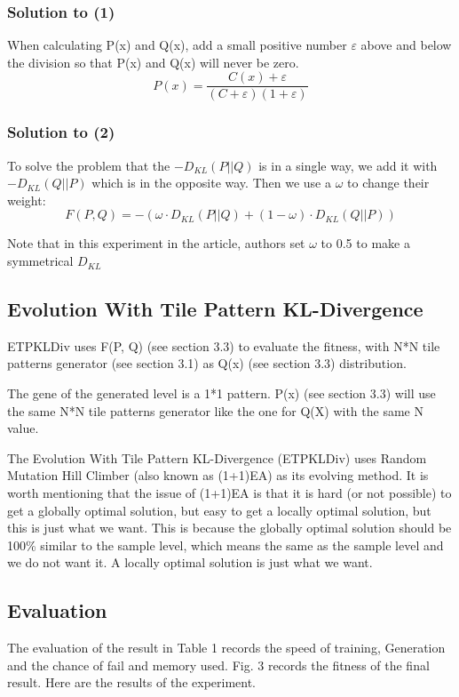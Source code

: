 \documentclass[runningheads]{llncs}
\begin{document}
\subsubsection{Solution to (1)}
When calculating P(x) and Q(x), add a small positive number \(\varepsilon\) above and below the division so that P(x) and Q(x) will never be zero.
\[P(x) = \frac{C(x)+\varepsilon }{(C+\varepsilon )(1+\varepsilon )}\]

\subsubsection{Solution to (2)}
To solve the problem that the \(-D_{KL}(P||Q) \) is in a single way, we add it with  \(-D_{KL}(Q||P) \) which is in the opposite way. Then we use a \(\omega\) to change their weight:
\[F(P,Q) = -(\omega \cdot D_{KL}(P||Q) + (1-\omega)\cdot D_{KL}(Q||P) )\]

Note that in this experiment in the article, authors set \(\omega\) to 0.5 to make a symmetrical \(D_{KL} \)

\subsection{ Evolution With Tile Pattern KL-Divergence}
ETPKLDiv uses F(P, Q) (see section 3.3) to evaluate the fitness, with N*N tile patterns generator (see section 3.1) as Q(x) (see section 3.3) distribution. 

The gene of the generated level is a 1*1 pattern. P(x) (see section 3.3) will use the same N*N tile patterns generator like the one for Q(X) with the same N value.

The Evolution With Tile Pattern KL-Divergence (ETPKLDiv) uses Random Mutation Hill Climber (also known as (1+1)EA) as its evolving method. It is worth mentioning that the issue of (1+1)EA is that it is hard (or not possible) to get a globally optimal solution, but easy to get a locally optimal solution, but this is just what we want. This is because the globally optimal solution should be 100\% similar to the sample level, which means the same as the sample level and we do not want it. A locally optimal solution is just what we want.


\subsection{Evaluation}
The evaluation of the result in Table 1 records the speed of training, Generation and the chance of fail and memory used. Fig. 3 records the fitness of the final result. 
Here are the results of the experiment.
\end{document}
